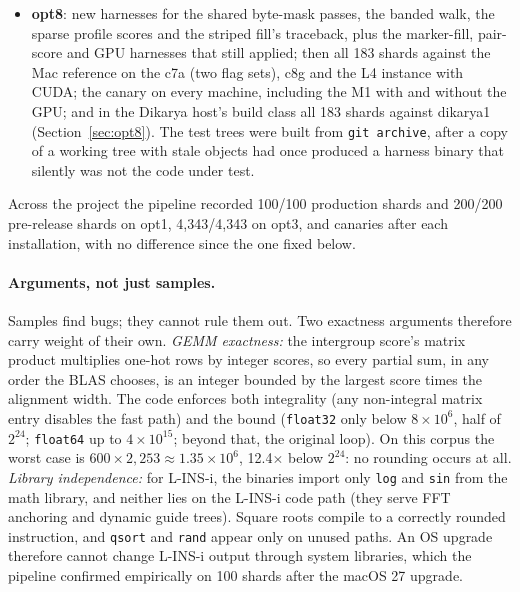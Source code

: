 \documentclass[11pt]{article}
\newcommand{\code}[1]{\texttt{#1}}
\begin{document}
\begin{itemize}
\item \textbf{opt8}: new harnesses for the shared byte-mask passes, the banded walk, the sparse
  profile scores and the striped fill's traceback, plus the marker-fill, pair-score and GPU
  harnesses that still applied; then all 183 shards against the Mac reference on the c7a (two
  flag sets), c8g and the L4 instance with CUDA; the canary on every machine, including the M1
  with and without the GPU; and in the Dikarya host's build class all 183 shards against dikarya1
  (Section~\ref{sec:opt8}). The test trees were built from \code{git archive}, after a copy of a
  working tree with stale objects had once produced a harness binary that silently was not the
  code under test.
\end{itemize}

Across the project the pipeline recorded 100/100 production shards and 200/200 pre-release
shards on opt1, 4{,}343/4{,}343 on opt3, and canaries after each installation, with no
difference since the one fixed below.

\paragraph{Arguments, not just samples.} Samples find bugs; they cannot rule them out. Two
exactness arguments therefore carry weight of their own. \emph{GEMM exactness:} the
intergroup score's matrix product multiplies one-hot rows by integer scores, so every
partial sum, in any order the BLAS chooses, is an integer bounded by the largest score times
the alignment width. The code enforces both integrality (any non-integral matrix entry
disables the fast path) and the bound (\code{float32} only below $8\times10^6$, half of $2^{24}$;
\code{float64} up to $4\times10^{15}$; beyond that, the original loop). On this corpus the worst
case is $600 \times 2{,}253 \approx 1.35\times10^6$, 12.4$\times$ below $2^{24}$: no rounding
occurs at all. \emph{Library independence:} for L-INS-i, the binaries import only \code{log}
and \code{sin} from the math library, and neither lies on the L-INS-i code path (they serve
FFT anchoring and dynamic guide trees). Square roots compile to a correctly rounded
instruction, and \code{qsort} and \code{rand} appear only on unused paths. An OS upgrade
therefore cannot change L-INS-i output through system libraries, which the pipeline
confirmed empirically on 100 shards after the macOS 27 upgrade.
\end{document}
